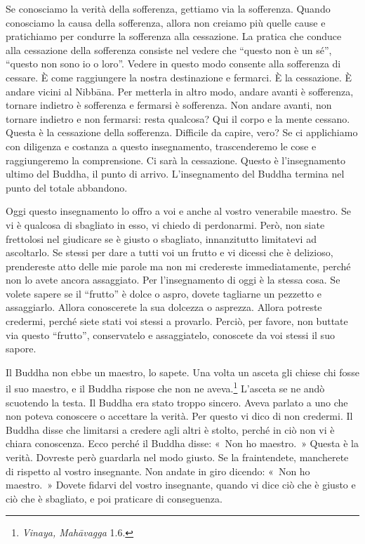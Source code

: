 Se conosciamo la verità della sofferenza, gettiamo via la sofferenza.
Quando conosciamo la causa della sofferenza, allora non creiamo più
quelle cause e pratichiamo per condurre la sofferenza alla cessazione.
La pratica che conduce alla cessazione della sofferenza consiste nel
vedere che ``questo non è un sé'', ``questo non sono io o loro''. Vedere
in questo modo consente alla sofferenza di cessare. È come raggiungere
la nostra destinazione e fermarci. È la cessazione. È andare vicini al
Nibbāna. Per metterla in altro modo, andare avanti è sofferenza,
tornare indietro è sofferenza e fermarsi è sofferenza. Non andare
avanti, non tornare indietro e non fermarsi: resta qualcosa? Qui il
corpo e la mente cessano. Questa è la cessazione della sofferenza.
Difficile da capire, vero? Se ci applichiamo con diligenza e costanza a
questo insegnamento, trascenderemo le cose e raggiungeremo la
comprensione. Ci sarà la cessazione. Questo è l'insegnamento ultimo del
Buddha, il punto di arrivo. L'insegnamento del Buddha termina nel punto
del totale abbandono.

Oggi questo insegnamento lo offro a voi e anche al vostro venerabile
maestro. Se vi è qualcosa di sbagliato in esso, vi chiedo di perdonarmi.
Però, non siate frettolosi nel giudicare se è giusto o sbagliato,
innanzitutto limitatevi ad ascoltarlo. Se stessi per dare a tutti voi un
frutto e vi dicessi che è delizioso, prendereste atto delle mie parole
ma non mi credereste immediatamente, perché non lo avete ancora
assaggiato. Per l'insegnamento di oggi è la stessa cosa. Se volete
sapere se il ``frutto'' è dolce o aspro, dovete tagliarne un pezzetto e
assaggiarlo. Allora conoscerete la sua dolcezza o asprezza. Allora
potreste credermi, perché siete stati voi stessi a provarlo. Perciò, per
favore, non buttate via questo ``frutto'', conservatelo e assaggiatelo,
conoscete da voi stessi il suo sapore.

Il Buddha non ebbe un maestro, lo sapete. Una volta un asceta gli chiese
chi fosse il suo maestro, e il Buddha rispose che non ne
aveva.\footnote{\emph{Vinaya, Mahāvagga} 1.6.} L'asceta se ne andò
scuotendo la testa. Il Buddha era stato troppo sincero. Aveva parlato a
uno che non poteva conoscere o accettare la verità. Per questo vi dico
di non credermi. Il Buddha disse che limitarsi a credere agli altri è
stolto, perché in ciò non vi è chiara conoscenza. Ecco perché il Buddha
disse: «~Non ho maestro.~» Questa è la verità. Dovreste però guardarla
nel modo giusto. Se la fraintendete, mancherete di rispetto al vostro
insegnante. Non andate in giro dicendo: «~Non ho maestro.~» Dovete
fidarvi del vostro insegnante, quando vi dice ciò che è giusto e ciò che
è sbagliato, e poi praticare di conseguenza.

